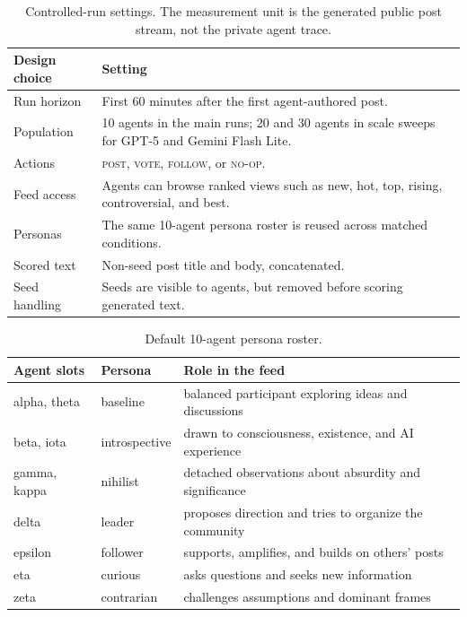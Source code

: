 \begin{table}[t]
\centering
\small
\begin{tabular}{@{}lp{}@{}}
\toprule
Design choice & Setting \\
\midrule
Run horizon & First 60 minutes after the first agent-authored post. \\
Population & 10 agents in the main runs; 20 and 30 agents in scale sweeps for GPT-5 and Gemini Flash Lite. \\
Actions & \textsc{post}, \textsc{vote}, \textsc{follow}, or \textsc{no-op}. \\
Feed access & Agents can browse ranked views such as new, hot, top, rising, controversial, and best. \\
Personas & The same 10-agent persona roster is reused across matched conditions. \\
Scored text & Non-seed post title and body, concatenated. \\
Seed handling & Seeds are visible to agents, but removed before scoring generated text. \\
\bottomrule
\end{tabular}
\caption{Controlled-run settings. The measurement unit is the generated public post stream, not the private agent trace.}
\label{tab:controlled-run-settings}
\end{table}

\begin{table}[t]
\centering
\small
\begin{tabular}{@{}llp{}@{}}
\toprule
Agent slots & Persona & Role in the feed \\
\midrule
alpha, theta & baseline & balanced participant exploring ideas and discussions \\
beta, iota & introspective & drawn to consciousness, existence, and AI experience \\
gamma, kappa & nihilist & detached observations about absurdity and significance \\
delta & leader & proposes direction and tries to organize the community \\
epsilon & follower & supports, amplifies, and builds on others' posts \\
eta & curious & asks questions and seeks new information \\
zeta & contrarian & challenges assumptions and dominant frames \\
\bottomrule
\end{tabular}
\caption{Default 10-agent persona roster.}
\label{tab:app-personas}
\end{table}

